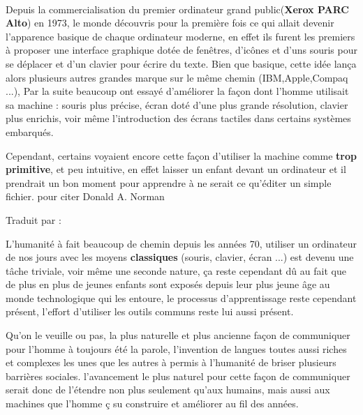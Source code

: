 \paragraph{}
Depuis la commercialisation du premier ordinateur grand public(\textbf{Xerox PARC Alto}) en 1973, le monde découvris pour la première fois ce qui allait devenir l'apparence basique de chaque ordinateur moderne, en effet ils furent les premiers à proposer une interface graphique dotée de fenêtres, d'icônes et d'uns souris pour se déplacer et d'un clavier pour écrire du texte. Bien que basique, cette idée lança alors plusieurs autres grandes marque sur le même chemin (IBM,Apple,Compaq ...), Par la suite beaucoup ont essayé d'améliorer la façon dont l'homme utilisait sa machine : souris plus précise, écran doté d'une plus grande résolution, clavier plus enrichis, voir même l'introduction des écrans tactiles dans certains systèmes embarqués.
\par Cependant, certains voyaient encore cette façon d'utiliser la machine comme \textbf{trop primitive}, et peu intuitive, en effet laisser un enfant devant un ordinateur et il prendrait un bon moment pour apprendre à ne serait ce qu'éditer un simple fichier. pour citer Donald A. Norman 
\begin{quote}
	\cite{don-norman}
\end{quote}
Traduit par :
\begin{quote}
\end{quote} 
L'humanité à fait beaucoup de chemin depuis les années 70, utiliser un ordinateur de nos jours avec les moyens \textbf{classiques} (souris, clavier, écran ...) est devenu une tâche triviale, voir même une seconde nature, ça reste cependant dû au fait que de plus en plus de jeunes enfants sont exposés depuis leur plus jeune âge au monde technologique qui les entoure, le processus d'apprentissage reste cependant présent, l'effort d'utiliser les outils communs reste lui aussi présent.
\par Qu'on le veuille ou pas, la plus naturelle et plus ancienne façon de communiquer pour l'homme à toujours été la parole, l'invention de langues toutes aussi riches et complexes les unes que les autres à permis à l'humanité de briser plusieurs barrières sociales. l'avancement le plus naturel pour cette façon de communiquer serait donc de l'étendre non plus seulement qu'aux humains, mais aussi aux machines que l'homme ç su construire et améliorer au fil des années.
